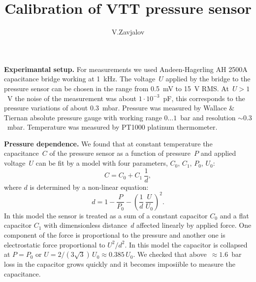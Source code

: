 \documentclass[a4paper]{article}
\title{Calibration of VTT pressure sensor}
\author{V.Zavjalov}
\begin{document}
\maketitle

{\bf Experimantal setup.} For measurements we used Andeen-Hagerling AH
2500A capacitance bridge working at 1~kHz. The voltage~$U$ applied by the
bridge to the pressure sensor can be chosen in the range from 0.5~mV to
15~V RMS. At~$U>1$~V the noise of the measurement was about
$1\cdot10^{-3}$~pF, this corresponds to the pressure variations of about
$0.3$~mbar. Pressure was measured by Wallace \& Tiernan absolute pressure
gauge with working range $0\ldots1$~bar and resolution $\sim 0.3$~mbar.
Temperature was measured by PT1000 platinum thermometer.


{\bf Pressure dependence.} We found that at constant temperature the
capacitance~$C$ of the pressure sensor as a function of pressure~$P$ and
applied voltage~$U$ can be fit by a model with four parameters, $C_0$,
$C_1$, $P_0$, $U_0$:
\begin{equation}\label{eq:mod}
C = C_0 + C_1\ \frac{1}{d},
\end{equation}
where $d$ is determined by a non-linear equation:
\begin{equation}
d = 1 - \frac{P}{P_0} - \left(\frac{1}{d}\ \frac{U}{U_0}\right)^2.
\end{equation}
In this model the sensor is treated as a sum of a constant capacitor
$C_0$ and a flat capacitor $C_1$ with dimensionless distance~$d$ affected
linearly by applied force. One component of the force is proportional to
the pressure and another one is electrostatic force proportional to $U^2/d^2$. In
this model the capacitor is collapsed at $P=P_0$ or
$U=2/(3\sqrt{3})\,U_0\approx 0.385\,U_0$. We checked that above~$\approx 1.6$~bar
loss in the capacitor grows quickly and it becomes imposiible to measure
the capacitance.
\end{document}
